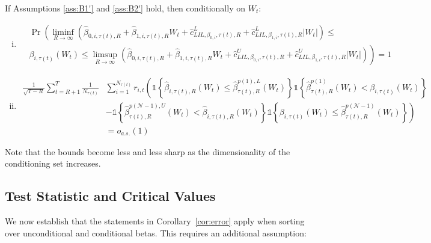 \begin{propositionBprime}
    \label{prop:B'}
    If Assumptions \ref{ass:B1'} and \ref{ass:B2'} hold, then conditionally on $W_t$:

\begin{enumerate}[(i)]
\item
\begin{align*}
    & \Pr \left( \liminf_{R\to\infty} \left( \widehat{\beta}_{0,i,\tau(t),R}+\widehat{\beta }_{1,i,\tau(t),R}W_t+\widehat{c}_{LIL,\beta_{0,i},\tau(t),R}^{L}+\widehat{c}_{LIL,\beta_{1,i},\tau(t),R}^{L}\left\vert W_t \right\vert \right) \leq \right. \\
    & \left. \beta_{i,\tau(t)} \left(W_t\right) \leq \limsup_{R\to\infty} \left( \widehat{\beta}_{0,i,\tau(t),R}+\widehat{\beta}_{1,i,\tau(t),R}W_t+\widehat{c}_{LIL,\beta _{0,i},\tau(t),R}^{U}+\widehat{c}_{LIL,\beta_{1,i},\tau(t),R}^{U}\left\vert W_t \right\vert \right) \right) = 1
\end{align*}
\item
\begin{align*}
    \frac{1}{\sqrt{T-R}}\sum_{t=R+1}^{T} \frac{1}{N_{\tau(t)}}&\sum_{i=1}^{N_{\tau(t)}}r_{i,t} \left( \mathds{1}\left\{ \widehat{\beta }_{i,\tau(t),R}\left( W_t\right) \leq \widehat{\beta}_{\tau(t),R}^{p(1),L}\left( W_t\right) \right\} \mathds{1}\left\{ \widehat{\beta }_{\tau(t),R}^{p(1)}\left( W_t\right) < \beta_{i,\tau(t)}\left( W_t\right) \right\} \right. \\
    &\left. -\mathds{1}\left\{ \widehat{\beta }_{\tau(t),R}^{p(\mathcal{N}-1),U}\left( W_t\right) < \widehat{\beta}_{i,\tau(t),R}\left( W_t\right) \right\} \mathds{1}\left\{ \beta _{i,\tau(t) }\left( W_t\right) \leq \widehat{\beta}_{\tau(t),R}^{p(\mathcal{N}-1)}\left( W_t\right) \right\} \right) \\
    &= o_{a.s.}(1)
\end{align*}
\end{enumerate}
\end{propositionBprime}
\noindent 
Note that the bounds become less and less sharp as the dimensionality of the conditioning set increases.

\subsection{Test Statistic and Critical Values}

We now establish that the statements in Corollary~\ref{cor:error} apply when sorting over unconditional and conditional betas. This requires an additional assumption:

